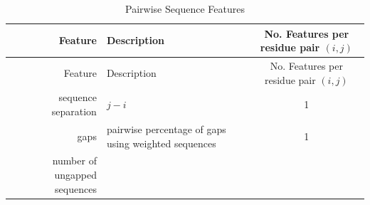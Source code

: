 \documentclass[11pt,a4paper,twoside]{book}
\theoremstyle{definition}
\theoremstyle{definition}
\theoremstyle{remark}
\begin{document}
\begin{longtable}[]{@{}rlc@{}}
\caption{\label{tab:pairwise-position-features} Pairwise Sequence
Features}\tabularnewline
\toprule
\begin{minipage}[b]{0.23\columnwidth}\raggedleft\strut
Feature\strut
\end{minipage} & \begin{minipage}[b]{0.50\columnwidth}\raggedright\strut
Description\strut
\end{minipage} & \begin{minipage}[b]{0.18\columnwidth}\centering\strut
No. Features per residue pair \((i, j)\)\strut
\end{minipage}\tabularnewline
\midrule
\endfirsthead
\toprule
\begin{minipage}[b]{0.23\columnwidth}\raggedleft\strut
Feature\strut
\end{minipage} & \begin{minipage}[b]{0.50\columnwidth}\raggedright\strut
Description\strut
\end{minipage} & \begin{minipage}[b]{0.18\columnwidth}\centering\strut
No. Features per residue pair \((i, j)\)\strut
\end{minipage}\tabularnewline
\midrule
\endhead
\begin{minipage}[t]{0.23\columnwidth}\raggedleft\strut
sequence separation\strut
\end{minipage} & \begin{minipage}[t]{0.50\columnwidth}\raggedright\strut
\(j-i\)\strut
\end{minipage} & \begin{minipage}[t]{0.18\columnwidth}\centering\strut
1\strut
\end{minipage}\tabularnewline
\begin{minipage}[t]{0.23\columnwidth}\raggedleft\strut
gaps\strut
\end{minipage} & \begin{minipage}[t]{0.50\columnwidth}\raggedright\strut
pairwise percentage of gaps using weighted sequences\strut
\end{minipage} & \begin{minipage}[t]{0.18\columnwidth}\centering\strut
1\strut
\end{minipage}\tabularnewline
\begin{minipage}[t]{0.23\columnwidth}\raggedleft\strut
number of ungapped sequences\strut
\end{minipage} & \begin{minipage}[t]{0.50\columnwidth}\raggedright\strut

\end{minipage}
\end{longtable}
\end{document}
